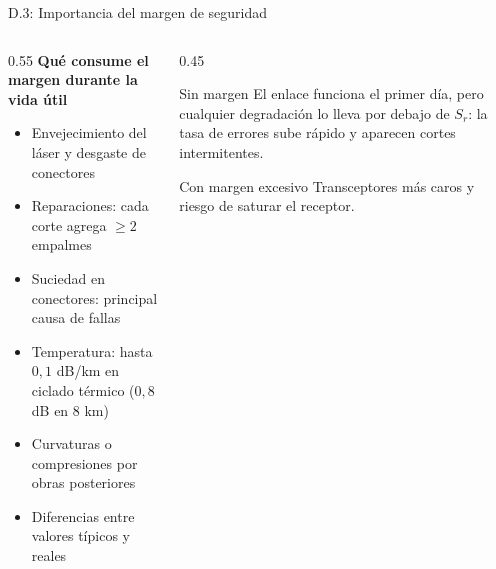 \begin{frame}{D.3: Importancia del margen de seguridad}
  \begin{columns}[T]
    \begin{column}{0.55\textwidth}
      \textbf{Qué consume el margen durante la vida útil}
      \begin{itemize}
        \item Envejecimiento del láser y desgaste de conectores
        \item Reparaciones: cada corte agrega $\geq 2$ empalmes
        \item Suciedad en conectores: principal causa de fallas
        \item Temperatura: hasta $0{,}1$ dB/km en ciclado térmico ($0{,}8$ dB en 8 km)
        \item Curvaturas o compresiones por obras posteriores
        \item Diferencias entre valores típicos y reales
      \end{itemize}
    \end{column}
    \begin{column}{0.45\textwidth}
      \begin{block}{Sin margen}
        El enlace funciona el primer día, pero cualquier degradación lo lleva por debajo de $S_r$: la tasa de errores sube rápido y aparecen cortes intermitentes.
      \end{block}
      \begin{block}{Con margen excesivo}
        Transceptores más caros y riesgo de saturar el receptor.
      \end{block}
    \end{column}
  \end{columns}
\end{frame}

